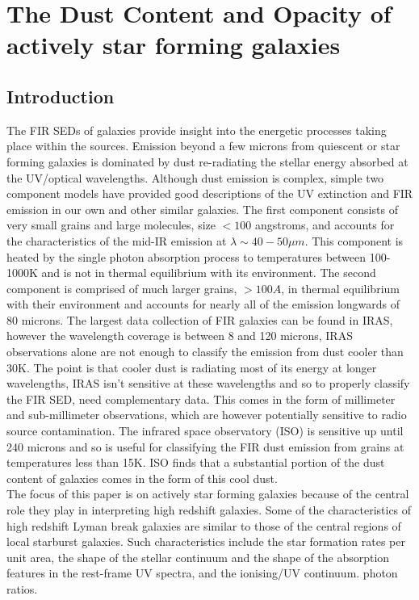 \documentclass{literature}
\begin{document}

\section{The Dust Content and Opacity of actively star forming galaxies}\label{sec:Calzetti law}
\subsection{Introduction}
The FIR SEDs of galaxies provide insight into the energetic processes taking place within the sources. Emission beyond a few microns from quiescent or star forming galaxies is dominated by dust re-radiating the stellar energy absorbed at the UV/optical wavelengths. Although dust emission is complex, simple two component models have provided good descriptions of the UV extinction and FIR emission in our own and other similar galaxies. The first component consists of very small grains and large molecules, size $<100$ angstroms, and accounts for the characteristics of the mid-IR emission at $\lambda \sim 40-50\mu m$. This component is heated by the single photon absorption process to temperatures between 100-1000K and is not in thermal equilibrium with its environment. The second component is comprised of much larger grains, $> 100A$, in thermal equilibrium with their environment and accounts for nearly all of the emission longwards of 80 microns. The largest data collection of FIR galaxies can be found in IRAS, however the wavelength coverage is between 8 and 120 microns, IRAS observations alone are not enough to classify the emission from dust cooler than 30K. The point is that cooler dust is radiating most of its energy at longer wavelengths, IRAS isn't sensitive at these wavelengths and so to properly classify the FIR SED, need complementary data. This comes in the form of millimeter and sub-millimeter observations, which are however potentially sensitive to radio source contamination. The infrared space observatory (ISO) is sensitive up until 240 microns and so is useful for classifying the FIR dust emission from grains at temperatures less than 15K. ISO finds that a substantial portion of the dust content of galaxies comes in the form of this cool dust. \\
The focus of this paper is on actively star forming galaxies because of the central role they play in interpreting high redshift galaxies. Some of the characteristics of high redshift Lyman break galaxies are similar to those of the central regions of local starburst galaxies. Such characteristics include the star formation rates per unit area, the shape of the stellar continuum and the shape of the absorption features in the rest-frame UV spectra, and the ionising/UV continuum. photon ratios. 
\end{document}
